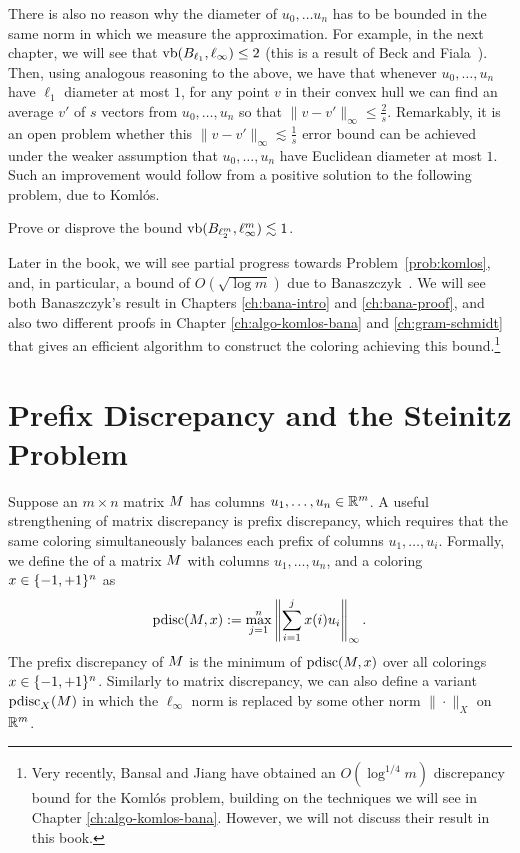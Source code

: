 There is also no reason why
the diameter of $u_0, \ldots u_n$ has to be bounded in the same norm in
which we measure the approximation. For example, in the next chapter,
we will see that $\operatorname{vb}(B_{\ell_1},\ell_\infty) \le 2$ (this is a
result of Beck and Fiala~\cite{BF81}). Then, using analogous reasoning to the above, we have that whenever $u_0, \ldots,
u_n$ have $\ell_1$ diameter at most $1$, for any point $v$ in their
convex hull we can find an average $v'$ of $s$ vectors from
$u_0, \ldots, u_n$ so that $\|v - v'\|_\infty \le
\frac{2}{s}$. Remarkably, it is an open problem whether this 
$\|v - v'\|_\infty \lesssim \frac{1}{s}$
error bound can be achieved under the weaker assumption that $u_0, \ldots,
u_n$ have Euclidean diameter at most $1$. Such an improvement would
follow from a positive solution to the following problem, due to
Koml\'os. 
\begin{problem}\label{prob:komlos}
  Prove or disprove the bound $\operatorname{vb}(B_{\ell_2^m},\ell_\infty^m)
  \lesssim 1$.
\end{problem}

Later in the book, we will see partial progress towards
Problem~\ref{prob:komlos}, and, in particular, a bound of
$O(\sqrt{\log m})$ due to Banaszczyk~\cite{Bana98}. We will see both
Banaszczyk's result in Chapters \ref{ch:bana-intro} and \ref{ch:bana-proof}, and also two different proofs in Chapter \ref{ch:algo-komlos-bana} and \ref{ch:gram-schmidt} that gives an efficient
algorithm to construct the coloring achieving this bound.\footnote{Very recently, Bansal and Jiang \cite{bansaljiang2025} have obtained an $O(\log^{1/4} m)$ discrepancy bound for the Koml\'{o}s problem, building on the techniques we will see in Chapter \ref{ch:algo-komlos-bana}. However, we will not discuss their result in this book.}


\section{Prefix Discrepancy and the Steinitz Problem}
\label{sec:ch1-steinitz}

Suppose an $m\times n$ matrix $M$ has columns $u_1, \ldots, u_n \in \mathbb{R}^m$. A useful strengthening of matrix discrepancy is prefix discrepancy, which requires that the same coloring simultaneously balances each prefix of columns $u_1, \ldots, u_i$. Formally, we define the  of a matrix $M$ with columns $u_1, \ldots, u_n$, and a coloring $x \in \{-1,+1\}^n$   as 
\[
\operatorname{pdisc}(M, x) :=
\max_{j=1}^n \left\|\sum_{i = 1}^jx(i)u_i \right\|_\infty.
\]
The prefix discrepancy of $M$ is the minimum of $\operatorname{pdisc}(M, x)$ over all colorings $x \in \{-1,+1\}^n$. Similarly to matrix discrepancy, we can also define a variant $\operatorname{pdisc}_X(M)$ in which the $\ell_\infty$ norm is replaced by some other norm $\|\cdot\|_X$ on $\mathbb{R}^m$.

